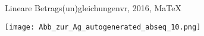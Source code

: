 \begin{MAufgabe}{Lineare Betrags(un)gleichungen}{vr, 2016, MaTeX}
 \begin{center}
 \texttt{[image: Abb\_zur\_Ag\_autogenerated\_abseq\_10.png]} \end{center}
 
\else\relax\fi
 \end{MAufgabe}
